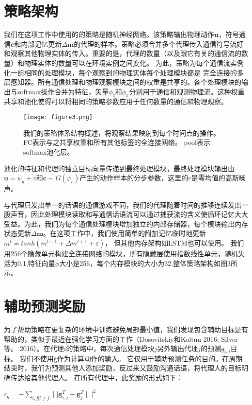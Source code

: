 \section{策略架构}
我们在这项工作中使用的的策略是随机神经网络。该策略输出物理动作$\mathbf{u}$，符号通信$\mathbf{c}$和内部记忆更新$\Delta\mathbf{m}$的代理的样本。策略必须合并多个代理传入通信符号流好和观察其他物理实体的传入。重要的是，代理的数量（以及跟它有关的通信流的数量）和物理实体的数量可以在环境实例之间变化。
为此，策略为每个通信流实例化一组相同的处理模块，每个观察到的物理实体每个处理模块都是
完全连接的多层感知器。所有通信处理和物理观察模块之间的权重是共享的。各个处理模块的输出与softmax操作合并为特征，矢量$\phi_c$和$\phi_x$分别用于通信和观测物理流。这种权重共享和池化使得可以将相同的策略参数应用于任何数量的通信和物理观察。
\begin{figure}[htb]
	\centering
	\texttt{[image: figure3.png]}
	\caption{我们的策略体系结构概述，将观察结果映射到每个时间点的操作。 FC表示与之共享权重和所有其他标签的全连接网络。 pool表示softmax池化层。}\label{fig:策略架构}
\end{figure}
\par 
池化的特征和代理的独立目标向量传递到最终处理模块，最终处理模块输出由$\textbf{u} = \psi_u + \varepsilon$和$\mathbf{c} \sim G(\psi_c)$产生的动作样本的分步参数，这里的$\varepsilon$是零均值的高斯噪声。
\par 
与代理只发出单一的话语的通信游戏不同，我们的代理随着时间的推移连续发出一股声音，因此处理模块读取和写通信话语流可以通过捕获流的含义使循环记忆大大受益。为此，我们为每个通信处理模块增加独立的内部存储器，每个模块输出内存状态更新$\Delta　\mathbf{m}$。在这项工作中，我们使用简单的附加记忆临时地更新$m^t = tanh(m^{t-1} + \Delta　m^{t+1} + \varepsilon)$，
但其他内存架构如LSTM也可以使用。 我们用256个隐藏单元构建全连接网络的模块，所有隐藏层使用指数线性单元，随机失活为0.1,特征向量$\phi$大小是256，每个内存模块的大小为32.整体策略架构如图3所示。


\section{辅助预测奖励}
为了帮助策略在更复杂的环境中训练避免局部最小值，我们发现包含辅助目标是有帮助的，类似于最近在强化学习方面的工作（Dosovitskiy和Koltun 2016; Silver等。
2016）。在代理$i$的策略中，每次通信处理模块$j$另外输出代理$j$的预测$g\hat{}_{i,j}$目标。 我们不使用ĝ作为计算动作的输入。 它仅用于辅助预测任务的目的。在周期结束时，我们为预测其他人添加奖励，反过来又鼓励沟通话语，将代理人的目标明确传达给其他代理人。
在所有代理中，此奖励的形式如下：
\par 
$r_g = - \sum_{i,j|i\not = j}^{}\mid\mid \textbf{g}\hat{}_{i,j}^T - \textbf{g}\hat{}_j^T\mid\mid^2$
　

